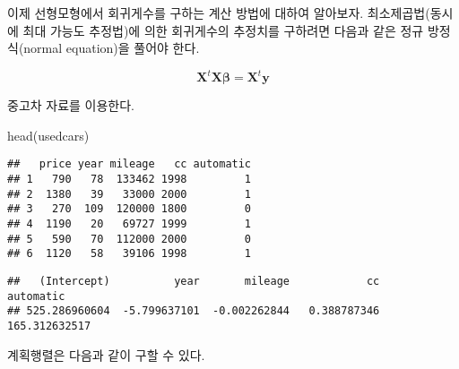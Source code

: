 \documentclass[
]{book}
\newenvironment{Shaded}{\begin{snugshade}}{\end{snugshade}}
\newcommand{\AttributeTok}[1]{\textcolor[rgb]{0.77,0.63,0.00}{#1}}
\newcommand{\FunctionTok}[1]{\textcolor[rgb]{0.00,0.00,0.00}{#1}}
\newcommand{\NormalTok}[1]{#1}
\newcommand{\OtherTok}[1]{\textcolor[rgb]{0.56,0.35,0.01}{#1}}
\newcommand{\SpecialCharTok}[1]{\textcolor[rgb]{0.00,0.00,0.00}{#1}}
\begin{document}
이제 선형모형에서 회귀게수를 구하는 계산 방법에 대하여 알아보자. 최소제곱법(동시에 최대 가능도 추정법)에 의한 회귀게수의 추정치를 구하려면 다음과 같은 정규 방정식(normal equation)을 풀어야 한다.

\begin{equation}
 {\bm X}^t \bm X \bm \beta = \bm X^t \bm y
\label{eq:comp-lse}
\end{equation}

중고차 자료를 이용한다.

\begin{Shaded}
\begin{Highlighting}[]
\FunctionTok{head}\NormalTok{(usedcars)}
\end{Highlighting}
\end{Shaded}

\begin{verbatim}
##   price year mileage   cc automatic
## 1   790   78  133462 1998         1
## 2  1380   39   33000 2000         1
## 3   270  109  120000 1800         0
## 4  1190   20   69727 1999         1
## 5   590   70  112000 2000         0
## 6  1120   58   39106 1998         1
\end{verbatim}

\begin{Shaded}
\end{Shaded}

\begin{verbatim}
##   (Intercept)          year       mileage            cc     automatic 
## 525.286960604  -5.799637101  -0.002262844   0.388787346 165.312632517
\end{verbatim}

계획행렬은 다음과 같이 구할 수 있다.

\begin{Shaded}
\end{Shaded}
\end{document}

